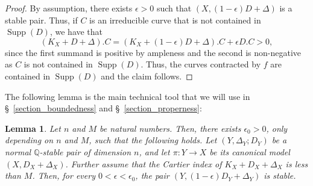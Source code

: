\documentclass{amsart}
\newcommand{\bQ}{\mathbb{Q}}
\newcommand{\supp}{\operatorname{Supp}}
\newtheorem{Lemma}[theorem]{Lemma}
\theoremstyle{definition}
\newcommand{\rar}{\rightarrow}
\def\K#1.{K_{#1}}
\begin{document}
\begin{proof}
By assumption, there exists $\epsilon>0$ such that $(X,(1-\epsilon)D + \Delta)$ is a stable pair.
Thus, if $C$ is an irreducible curve that is not contained in $\supp(D)$, we have that
\[
(\K X. + D + \Delta).C = (\K X. + (1-\epsilon)D + \Delta).C + \epsilon D .C >  0,
\]
since the first summand is positive by ampleness and the second is non-negative as $C$ is not contained in $\supp(D)$.
Thus, the curves contracted by $f$ are contained in $\supp(D)$ and the claim follows.
\end{proof}
The following lemma is the main technical tool that we will use in \S~\ref{section_boundedness} and \S~\ref{section_properness}:
\begin{Lemma}\label{lemma_bound_epsilon_lc_case}
Let $n$ and $M$ be natural numbers.
Then, there exists $\epsilon_0 > 0$, only depending on $n$ and $M$, such that the following holds.
Let $(Y,\Delta_Y;D_Y)$ be a normal $\bQ$-stable pair of dimension $n$, and let $\pi \colon Y \rar X$ be its canonical model $(X,D_X+\Delta_X)$.
Further assume that the Cartier index of $K_X + D_X + \Delta_X$ is less than $M$.
Then, for every $0 < \epsilon < \epsilon_0$, the pair $(Y,(1-\epsilon)D_Y+\Delta_Y)$ is stable.
\end{Lemma}
\end{document}
